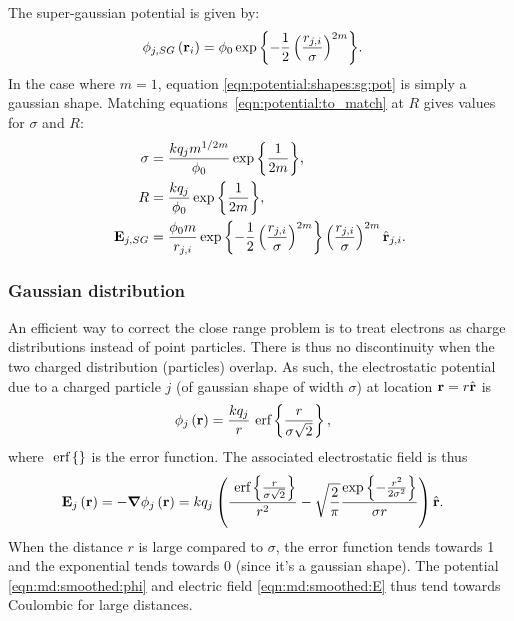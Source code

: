 The super-gaussian potential is given by:
\begin{align}
\phi_{j,SG}\left( \textbf{r}_i \right) & = \phi_0 \exp{ \left\{ 
                            -\frac{1}{2} \left( \frac{r_{j,i}}{\sigma} \right)^{2m}
                         \right\}}.
\label{eqn:potential:shapes:sg:pot}
\end{align}
In the case where $m = 1$, equation \eqref{eqn:potential:shapes:sg:pot} is simply
a gaussian shape. Matching equations~\eqref{eqn:potential:to_match} at $R$ gives
values for $\sigma$ and $R$:
\begin{subequations}
\begin{align}
\sigma  & = \frac{k q_j m^{1/2m}}{\phi_0} \exp{ \left\{ \frac{1}{2m} \right\}}, \\
R       & = \frac{k q_j}{\phi_0} \exp{ \left\{ \frac{1}{2m} \right\}}, \\
\textbf{E}_{j,SG} & = \frac{\phi_0 m}{r_{j,i}}
                \exp{ \left\{ -\frac{1}{2} \left( \frac{r_{j,i}}{\sigma} \right)^{2m} \right\}}
                \left(  \frac{r_{j,i}}{\sigma}  \right)^{2m}
                \hat{\textbf{r}}_{j,i}.
\end{align}
\label{eqn:potential:shapes:sg}
\end{subequations}





\subsubsection{Gaussian distribution}

An efficient way to correct the close range problem is to treat electrons as
charge distributions instead of point particles. There is thus no
discontinuity when the two charged distribution (particles) overlap. As such,
the electrostatic potential due to a charged particle $j$
(of gaussian shape of width $\sigma$) at location $\textbf{r} = r \hat{\textbf{r}}$ is
\begin{align}
\phi_{j}\left( \textbf{r} \right) & = \frac{k q_j}{r} ~\textrm{erf} \left\{\frac{r}{\sigma \sqrt{2}}\right\},
\label{eqn:md:smoothed:phi}
\end{align}
where $~\textrm{erf} \left\{\right\}$ is the error function. The associated electrostatic field is thus
\begin{align}
\textbf{E}_{j}\left( \textbf{r} \right) & = -\bm{\nabla} \phi_j\left( \textbf{r} \right) = k q_j \left( 
    \frac{ ~\textrm{erf} \left\{\frac{r}{\sigma\sqrt{2}}\right\} }{r^2}
    - \sqrt{\frac{2}{\pi}} \frac{ \exp{ \left\{ -\frac{r^2}{2 \sigma^2} \right\}} }{\sigma r}
 \right) \hat{\textbf{r}}.
\label{eqn:md:smoothed:E}
\end{align}
When the distance $r$ is large compared to $\sigma$, the error function
tends towards 1 and the exponential tends towards 0 (since it's a gaussian
shape). The potential \eqref{eqn:md:smoothed:phi} and electric field
\eqref{eqn:md:smoothed:E} thus tend towards Coulombic for large distances.

